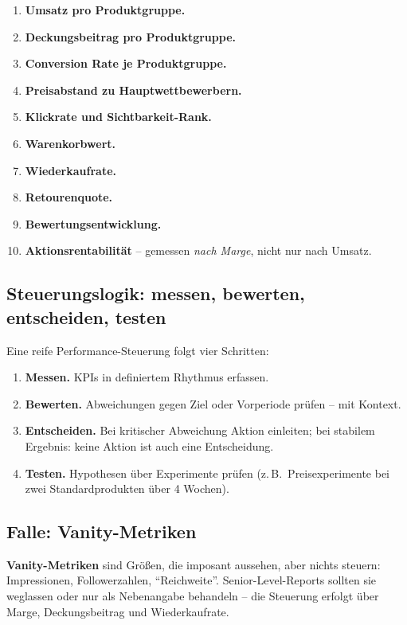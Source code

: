\documentclass[11pt,a4paper,oneside]{article}
\newcommand{\fachbegriff}[1]{\textbf{#1}}
\begin{document}
\begin{enumerate}
  \item \fachbegriff{Umsatz pro Produktgruppe.}
  \item \fachbegriff{Deckungsbeitrag pro Produktgruppe.}
  \item \fachbegriff{Conversion Rate je Produktgruppe.}
  \item \fachbegriff{Preisabstand zu Hauptwettbewerbern.}
  \item \fachbegriff{Klickrate und Sichtbarkeit-Rank.}
  \item \fachbegriff{Warenkorbwert.}
  \item \fachbegriff{Wiederkaufrate.}
  \item \fachbegriff{Retourenquote.}
  \item \fachbegriff{Bewertungsentwicklung.}
  \item \fachbegriff{Aktionsrentabilität} -- gemessen \emph{nach Marge}, nicht nur nach Umsatz.
\end{enumerate}

\subsection{Steuerungslogik: messen, bewerten, entscheiden, testen}

Eine reife Performance-Steuerung folgt vier Schritten:

\begin{enumerate}
  \item \textbf{Messen.} KPIs in definiertem Rhythmus erfassen.
  \item \textbf{Bewerten.} Abweichungen gegen Ziel oder Vorperiode prüfen -- mit Kontext.
  \item \textbf{Entscheiden.} Bei kritischer Abweichung Aktion einleiten; bei stabilem Ergebnis: keine Aktion ist auch eine Entscheidung.
  \item \textbf{Testen.} Hypothesen über Experimente prüfen (z.\,B.\ Preisexperimente bei zwei Standardprodukten über 4 Wochen).
\end{enumerate}

\subsection{Falle: Vanity-Metriken}

\fachbegriff{Vanity-Metriken} sind Größen, die imposant aussehen, aber nichts steuern: Impressionen, Followerzahlen, ``Reichweite''. Senior-Level-Reports sollten sie weglassen oder nur als Nebenangabe behandeln -- die Steuerung erfolgt über Marge, Deckungsbeitrag und Wiederkaufrate.
\end{document}
